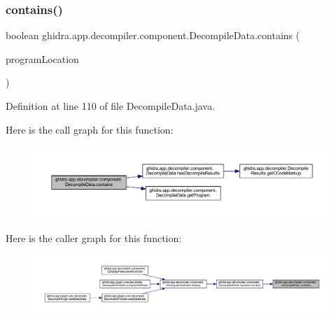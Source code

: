 \subsubsection{\texorpdfstring{contains()}{contains()}}
{\footnotesize\ttfamily boolean ghidra.\+app.\+decompiler.\+component.\+Decompile\+Data.\+contains (\begin{DoxyParamCaption}\item[{Program\+Location}]{program\+Location }\end{DoxyParamCaption})\hspace{0.3cm}{\ttfamily [inline]}}



Definition at line 110 of file Decompile\+Data.\+java.

Here is the call graph for this function\+:
\nopagebreak
\begin{figure}[H]
\begin{center}
\leavevmode
\includegraphics[width=350pt]{classghidra_1_1app_1_1decompiler_1_1component_1_1_decompile_data_abcc52036aeb7616c47c98e5314c7c8bd_cgraph}
\end{center}
\end{figure}
Here is the caller graph for this function\+:
\nopagebreak
\begin{figure}[H]
\begin{center}
\leavevmode
\includegraphics[width=350pt]{classghidra_1_1app_1_1decompiler_1_1component_1_1_decompile_data_abcc52036aeb7616c47c98e5314c7c8bd_icgraph}
\end{center}
\end{figure}
\mbox{\label{classghidra_1_1app_1_1decompiler_1_1component_1_1_decompile_data_a91564dbcfda4a4812e77a3ce7475b267}} 
